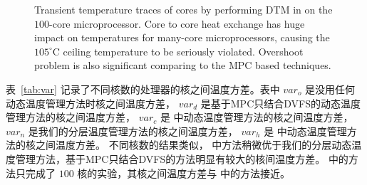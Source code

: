\begin{figure}
  \centering
  \caption{Transient temperature traces of cores by performing DTM in
    \cite{Hanumaiah:TCAD'11} on the $100$-core
    microprocessor. Core to core heat exchange has huge impact on
    temperatures for many-core microprocessors, causing the
    $105^{\circ}$C ceiling temperature to be seriously violated. Overshoot
    problem is also significant comparing to the MPC based techniques.}\label{fig:magma}
\end{figure}

表~\ref{tab:var} 记录了不同核数的处理器的核之间温度方差。表中 $var_o$ 是没用任何动态温度管理方法时核之间温度方差，
$var_d$ 是基于MPC只结合DVFS的动态温度管理方法的核之间温度方差，
$var_c$ 是 \cite{MaWang:APCCAS'14} 中动态温度管理方法的核之间温度方差，
$var_n$ 是我们的分层温度管理方法的核之间温度方差，
$var_h$ 是 \cite{Hanumaiah:TCAD'11} 中动态温度管理方法的核之间温度方差。
不同核数的结果类似， \cite{MaWang:APCCAS'14} 中方法稍微优于我们的分层动态温度管理方法，基于MPC只结合DVFS的方法明显有较大的核间温度方差。
\cite{Hanumaiah:TCAD'11} 中的方法只完成了 $100$ 核的实验，其核之间温度方差与 \cite{MaWang:APCCAS'14} 中的方法接近。

